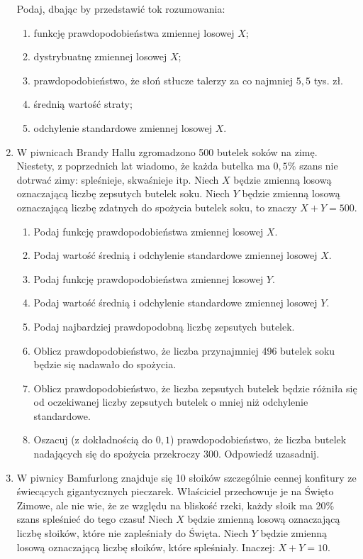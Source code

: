 \documentclass[twoside]{mwart}
\begin{document}
\begin{enumerate}
Podaj, dbając by przedstawić tok rozumowania:
\begin{enumerate}
\item funkcję prawdopodobieństwa zmiennej losowej $X$;
\item dystrybuatnę zmiennej losowej $X$;
\item prawdopodobieństwo, że słoń stłucze talerzy za co najmniej $5{,}5$ tys. zł.
\item średnią wartość straty;
\item odchylenie standardowe zmiennej losowej $X$.
\end{enumerate}
\newpage
\item W piwnicach Brandy Hallu zgromadzono 500 butelek soków na zimę.
Niestety, z poprzednich lat wiadomo, że każda butelka ma $0{,}5\%$ szans nie dotrwać zimy: spleśnieje, skwaśnieje itp.
Niech $X$ będzie zmienną losową oznaczającą liczbę zepsutych butelek soku.
Niech $Y$ będzie zmienną losową oznaczającą liczbę zdatnych do spożycia butelek soku, to znaczy $X+Y=500$.

\begin{enumerate}
\item Podaj funkcję prawdopodobieństwa zmiennej losowej $X$.
\item Podaj wartość średnią i odchylenie standardowe zmiennej losowej $X$.
\item Podaj funkcję prawdopodobieństwa zmiennej losowej $Y$.
\item Podaj wartość średnią i odchylenie standardowe zmiennej losowej $Y$.
\item Podaj najbardziej prawdopodobną liczbę zepsutych butelek.
\item Oblicz prawdopodobieństwo, że liczba przynajmniej 496 butelek soku będzie się nadawało do spożycia.
\item Oblicz prawdopodobieństwo, że liczba zepsutych butelek będzie różniła się od oczekiwanej liczby zepsutych butelek o mniej niż odchylenie standardowe.
\item Oszacuj (z dokładnością do $0{,}1$) prawdopodobieństwo, że liczba butelek nadających się do spożycia przekroczy 300. Odpowiedź uzasadnij.
\end{enumerate}
\item W piwnicy Bamfurlong znajduje się 10 słoików szczególnie cennej konfitury ze świecących gigantycznych pieczarek.
Właściciel przechowuje je na Święto Zimowe, ale nie wie, że ze względu na bliskość rzeki, każdy słoik ma 20\% szans spleśnieć do tego czasu!
Niech $X$ będzie zmienną losową oznaczającą liczbę słoików, które nie zapleśniały do Święta.
Niech $Y$ będzie zmienną losową oznaczającą liczbę słoików, które spleśniały.
Inaczej: $X+Y=10$.


\end{enumerate}
\end{document}
